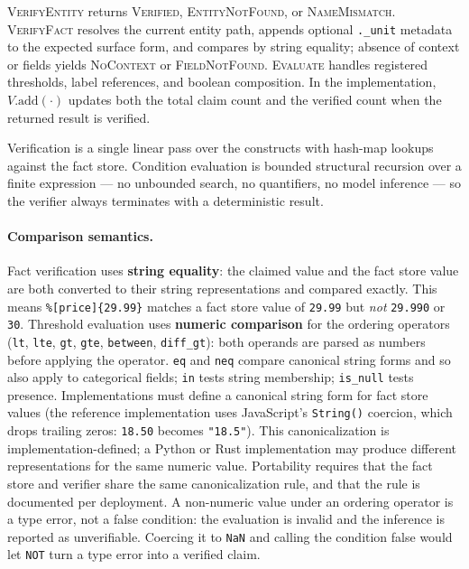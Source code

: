 \documentclass[11pt,a4paper]{article}
\begin{document}
\noindent \textsc{VerifyEntity} returns \textsc{Verified}, \textsc{EntityNotFound}, or \textsc{NameMismatch}. \textsc{VerifyFact} resolves the current entity path, appends optional \texttt{.\_unit} metadata to the expected surface form, and compares by string equality; absence of context or fields yields \textsc{NoContext} or \textsc{FieldNotFound}. \textsc{Evaluate} handles registered thresholds, label references, and boolean composition. In the implementation, $V.\text{add}(\cdot)$ updates both the total claim count and the verified count when the returned result is verified.

Verification is a single linear pass over the constructs with hash-map lookups against the fact store. Condition evaluation is bounded structural recursion over a finite expression --- no unbounded search, no quantifiers, no model inference --- so the verifier always terminates with a deterministic result.

\paragraph{Comparison semantics.} Fact verification uses \textbf{string equality}: the claimed value and the fact store value are both converted to their string representations and compared exactly. This means \texttt{\%[price]\{29.99\}} matches a fact store value of \texttt{29.99} but \textit{not} \texttt{29.990} or \texttt{30}. Threshold evaluation uses \textbf{numeric comparison} for the ordering operators (\texttt{lt}, \texttt{lte}, \texttt{gt}, \texttt{gte}, \texttt{between}, \texttt{diff\_gt}): both operands are parsed as numbers before applying the operator. \texttt{eq} and \texttt{neq} compare canonical string forms and so also apply to categorical fields; \texttt{in} tests string membership; \texttt{is\_null} tests presence. Implementations must define a canonical string form for fact store values (the reference implementation uses JavaScript's \texttt{String()} coercion, which drops trailing zeros: \texttt{18.50} becomes \texttt{"18.5"}). This canonicalization is implementation-defined; a Python or Rust implementation may produce different representations for the same numeric value. Portability requires that the fact store and verifier share the same canonicalization rule, and that the rule is documented per deployment. A non-numeric value under an ordering operator is a type error, not a false condition: the evaluation is invalid and the inference is reported as unverifiable. Coercing it to \texttt{NaN} and calling the condition false would let \texttt{NOT} turn a type error into a verified claim.
\end{document}
